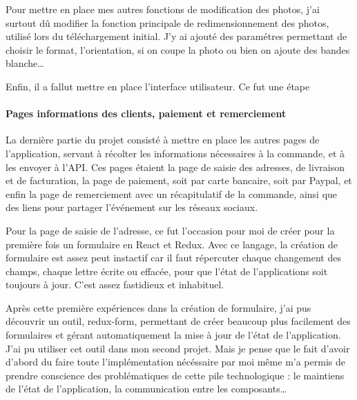 \documentclass[12pt,a4paper]{article}
\begin{document}
  \bigskip

  Pour mettre en place mes autres fonctions de modification des photos,
  j'ai surtout dû modifier la fonction principale de redimensionnement des
  photos, utilisé lors du téléchargement initial. J'y ai ajouté des
  paramétres permettant de choisir le format, l'orientation, si on coupe
  la photo ou bien on ajoute des bandes blanche\ldots{}

  \bigskip

  Enfin, il a fallut mettre en place l'interface utilisateur. Ce fut une
  étape

  \paragraph{Pages informations des clients, paiement et
  remerciement}\label{pages-informations-des-clients-paiement-et-remerciement}

  \bigskip

  La dernière partie du projet consisté à mettre en place les autres pages
  de l'application, servant à récolter les informations nécessaires à la
  commande, et à les envoyer à l'API. Ces pages étaient la page de saisie
  des adresses, de livraison et de facturation, la page de paiement, soit
  par carte bancaire, soit par Paypal, et enfin la page de remerciement
  avec un récapitulatif de la commande, ainsi que des liens pour partager
  l'événement sur les réseaux sociaux.

  \bigskip

  Pour la page de saisie de l'adresse, ce fut l'occasion pour moi de créer
  pour la première fois un formulaire en React et Redux. Avec ce langage,
  la création de formulaire est assez peut instactif car il faut
  répercuter chaque changement des champs, chaque lettre écrite ou
  effacée, pour que l'état de l'applications soit toujours à jour. C'est
  assez fastidieux et inhabituel.

  \bigskip

  Après cette première expériences dans la création de formulaire, j'ai
  pus découvrir un outil, redux-form, permettant de créer beaucoup plus
  facilement des formulaires et gérant automatiquement la mise à jour de
  l'état de l'application. J'ai pu utiliser cet outil dans mon second
  projet. Mais je pense que le fait d'avoir d'abord du faire toute
  l'implémentation nécéssaire par moi même m'a permis de prendre
  conscience des problématiques de cette pile technologique : le maintiens
  de l'état de l'application, la communication entre les
  composants\ldots{}
\end{document}
